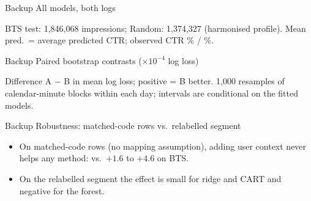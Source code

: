 \documentclass[aspectratio=169,10pt]{beamer}
\newcommand{\aside}[1]{{\footnotesize\color{muted}#1}}
\begin{document}
\begin{frame}{Backup \textperiodcentered{} All models, both logs}
\centering\small

\par\vspace{.2cm}
\aside{BTS test: 1{,}846{,}068 impressions; Random: 1{,}374{,}327 (harmonised profile). Mean pred.\ = average predicted CTR; observed CTR \btsTestCTR\% / \rndCTR\%.}
\end{frame}

\begin{frame}{Backup \textperiodcentered{} Paired bootstrap contrasts (\(\times 10^{-4}\) log loss)}
\centering\small

\par\vspace{.2cm}
\aside{Difference A \(-\) B in mean log loss; positive = B better. 1{,}000 resamples of calendar-minute blocks within each day; intervals are conditional on the fitted models.}
\end{frame}

\begin{frame}{Backup \textperiodcentered{} Robustness: matched-code rows vs.\ relabelled segment}
\centering\small

\par\vspace{.25cm}
\raggedright\small
\begin{itemize}
\item On matched-code rows (no mapping assumption), adding user context never helps any method: \ctxRangeSeen{} vs.\ \(+1.6\) to \(+4.6\) on BTS.
\item On the relabelled segment the effect is small for ridge and CART and negative for the forest.
\end{itemize}
\end{frame}
\end{document}
